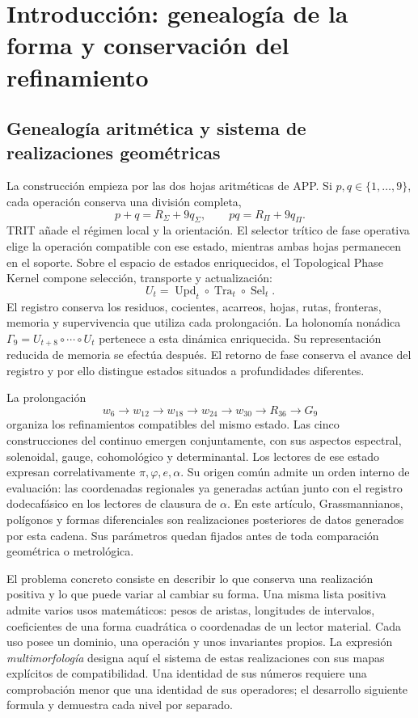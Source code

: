 \documentclass[a4paper,10pt]{article}
\theoremstyle{definition}\newtheorem{definition}[theorem]{Definición}
\theoremstyle{remark}\newtheorem{remark}[theorem]{Observación}
\numberwithin{equation}{section}
\begin{document}
\section{Introducción: genealogía de la forma y conservación del refinamiento}
\label{sec:genealogy}

\subsection{Genealogía aritmética y sistema de realizaciones geométricas}
La construcción empieza por las dos hojas aritméticas de APP. Si
\(p,q\in\{1,\ldots,9\}\), cada operación conserva una división completa,
\[
 p+q=R_\Sigma+9q_\Sigma,\qquad
 pq=R_\Pi+9q_\Pi.
\]
TRIT añade el régimen local y la orientación. El selector trítico de fase
operativa elige la operación compatible con ese estado, mientras ambas hojas
permanecen en el soporte. Sobre el espacio de estados enriquecidos, el
Topological Phase Kernel compone selección, transporte y actualización:
\[
 U_t=\operatorname{Upd}_t\circ\operatorname{Tra}_t\circ\operatorname{Sel}_t.
\]
El registro conserva los residuos, cocientes, acarreos, hojas, rutas,
fronteras, memoria y supervivencia que utiliza cada prolongación. La
holonomía nonádica \(\Gamma_9=U_{t+8}\circ\cdots\circ U_t\) pertenece
a esta dinámica enriquecida. Su representación reducida de memoria se efectúa
después. El retorno de fase conserva el avance del registro y por ello
distingue estados situados a profundidades diferentes.

La prolongación
\[
 w_6\longrightarrow w_{12}\longrightarrow w_{18}\longrightarrow
 w_{24}\longrightarrow w_{30}\longrightarrow R_{36}\longrightarrow G_9
\]
organiza los refinamientos compatibles del mismo estado. Las cinco
construcciones del continuo emergen conjuntamente, con sus aspectos
espectral, solenoidal, gauge, cohomológico y determinantal. Los lectores
de ese estado expresan correlativamente \(\pi,\varphi,e,\alpha\).
Su origen común admite un orden interno de evaluación: las coordenadas
regionales ya generadas actúan junto con el registro dodecafásico en los
lectores de clausura de \(\alpha\). En este artículo, Grassmannianos,
polígonos y formas diferenciales son realizaciones posteriores de datos
generados por esta cadena. Sus parámetros quedan fijados antes de toda
comparación geométrica o metrológica.

El problema concreto consiste en describir lo que conserva una realización
positiva y lo que puede variar al cambiar su forma. Una misma lista positiva
admite varios usos matemáticos: pesos de aristas, longitudes de intervalos,
coeficientes de una forma cuadrática o coordenadas de un lector material.
Cada uso posee un dominio, una operación y unos invariantes propios. La
expresión \emph{multimorfología} designa aquí el sistema de estas realizaciones
con sus mapas explícitos de compatibilidad. Una identidad de sus números
requiere una comprobación menor que una identidad de sus operadores; el
desarrollo siguiente formula y demuestra cada nivel por separado.
\end{document}
